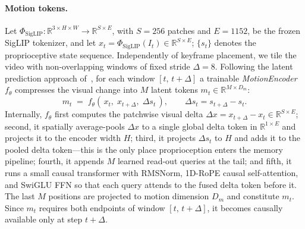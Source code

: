 \documentclass{article}
\begin{document}
\paragraph{Motion tokens.}
Let $\Phi_{\mathrm{SigLIP}}\!:\!\mathbb{R}^{3\times H\times W}\!\to\!\mathbb{R}^{S\times E}$, with $S\!=\!256$ patches and $E\!=\!1152$, be the frozen SigLIP tokenizer, and let $x_t \!=\! \Phi_{\mathrm{SigLIP}}(I_t)\in\mathbb{R}^{S\times E}$; $\{s_t\}$ denotes the proprioceptive state sequence.
Independently of keyframe placement, we tile the video with non-overlapping
windows of fixed stride $\Delta\!=\!8$. Following the
latent prediction approach of~\citet{assran2023ijepa}, for each window
$[t,\, t\!+\!\Delta]$ a trainable \emph{MotionEncoder}
$f_\theta$ compresses the visual change into $M$ latent tokens
$m_{t}\!\in\!\mathbb{R}^{M\times D_m}$:
\begin{equation}
  m_t \;=\; f_\theta\!\left(\, x_t,\; x_{t+\Delta},\; \Delta s_t \,\right),
  \qquad \Delta s_t = s_{t+\Delta} - s_t.
\end{equation}
Internally, $f_\theta$ first computes the patchwise visual delta
$\Delta x = x_{t+\Delta} - x_t \in \mathbb{R}^{S\times E}$; second, it spatially
average-pools $\Delta x$ to a single global delta token in
$\mathbb{R}^{1\times E}$ and projects it to the encoder width $H$;
third, it projects $\Delta s_t$ to $H$ and adds it to the pooled delta token---this
is the only place proprioception enters the memory pipeline;
fourth, it appends $M$ learned read-out queries at the tail; and
fifth, it runs a small causal transformer with RMSNorm, 1D-RoPE causal
self-attention, and SwiGLU FFN so that each query attends to the fused
delta token before it. The last $M$ positions are projected to motion
dimension $D_m$ and constitute $m_t$.
Since $m_t$ requires both endpoints of window $[t,\,t\!+\!\Delta]$, it becomes
causally available only at step $t\!+\!\Delta$.
\end{document}
